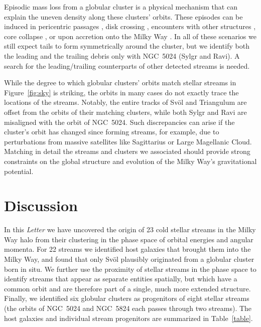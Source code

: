 \documentclass[twocolumn]{aastex63}
\begin{document}
Episodic mass loss from a globular cluster is a physical mechanism that can explain the uneven density along these clusters' orbits.
These episodes can be induced in pericentric passages \citep{general_stripping_ref}, disk crossing \citep{dehnen2004}, encounters with other structures \citep{?}, core collapse \citep{?}, or upon accretion onto the Milky Way \citep{?}.
In all of these scenarios we still expect tails to form symmetrically around the cluster, but we identify both the leading and the trailing debris only with NGC~5024 (Sylgr and Ravi).
A search for the leading/trailing counterparts of other detected streams is needed.

While the degree to which globular clusters' orbits match stellar streams in Figure~\ref{fig:sky} is striking, the orbits in many cases do not exactly trace the locations of the streams.
Notably, the entire tracks of Sv\" ol and Triangulum are offset from the orbits of their matching clusters, while both Sylgr and Ravi are misaligned with the orbit of NGC~5024.
Such discrepancies can arise if the cluster's orbit has changed since forming streams, for example, due to perturbations from massive satellites like Sagittarius or Large Magellanic Cloud.
Matching in detail the streams and clusters we associated should provide strong constraints on the global structure and evolution of the Milky Way's gravitational potential.


\section{Discussion}
\label{sec:discussion}

In this {\it Letter} we have uncovered the origin of 23 cold stellar streams in the Milky Way halo from their clustering in the phase space of orbital energies and angular momenta.
For 22 streams we identified host galaxies that brought them into the Milky Way, and found that only Sv\" ol plausibly originated from a globular cluster born in situ.
We further use the proximity of stellar streams in the phase space to identify streams that appear as separate entities spatially, but which have a common orbit and are therefore part of a single, much more extended structure.
Finally, we identified six globular clusters as progenitors of eight stellar streams (the orbits of NGC~5024 and NGC~5824 each passes through two streams).
The host galaxies and individual stream progenitors are summarized in Table~\ref{table}.
\end{document}
